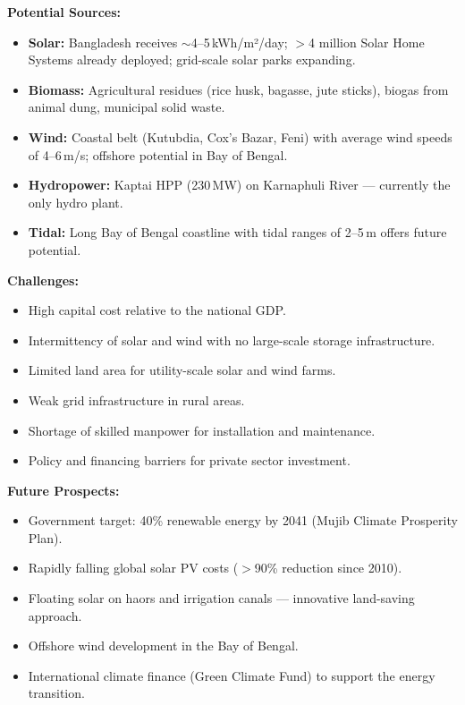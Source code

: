 \documentclass[12pt,a3paper]{article}
\begin{document}
\begin{enumerate}
\begin{tcolorbox}[enhanced,breakable,ansbox,colback=cA!4,colframe=cA,
  boxrule=0.8pt,arc=5pt,
  title={\textbf{Answer}},fonttitle=\bfseries\color{white},colbacktitle=cA]
\textbf{Potential Sources:}
\begin{itemize}[leftmargin=1.5em,itemsep=2pt]
  \item \textbf{Solar:} Bangladesh receives $\sim$4--5\,kWh/m²/day; $>$4 million Solar Home Systems already deployed; grid-scale solar parks expanding.
  \item \textbf{Biomass:} Agricultural residues (rice husk, bagasse, jute sticks), biogas from animal dung, municipal solid waste.
  \item \textbf{Wind:} Coastal belt (Kutubdia, Cox's Bazar, Feni) with average wind speeds of 4--6\,m/s; offshore potential in Bay of Bengal.
  \item \textbf{Hydropower:} Kaptai HPP (230\,MW) on Karnaphuli River — currently the only hydro plant.
  \item \textbf{Tidal:} Long Bay of Bengal coastline with tidal ranges of 2--5\,m offers future potential.
\end{itemize}

\textbf{Challenges:}
\begin{itemize}[leftmargin=1.5em,itemsep=2pt]
  \item High capital cost relative to the national GDP.
  \item Intermittency of solar and wind with no large-scale storage infrastructure.
  \item Limited land area for utility-scale solar and wind farms.
  \item Weak grid infrastructure in rural areas.
  \item Shortage of skilled manpower for installation and maintenance.
  \item Policy and financing barriers for private sector investment.
\end{itemize}

\textbf{Future Prospects:}
\begin{itemize}[leftmargin=1.5em,itemsep=2pt]
  \item Government target: 40\% renewable energy by 2041 (Mujib Climate Prosperity Plan).
  \item Rapidly falling global solar PV costs ($>$90\% reduction since 2010).
  \item Floating solar on haors and irrigation canals — innovative land-saving approach.
  \item Offshore wind development in the Bay of Bengal.
  \item International climate finance (Green Climate Fund) to support the energy transition.
\end{itemize}


\end{tcolorbox}
\end{enumerate}
\end{document}

